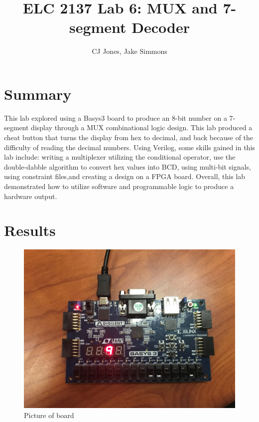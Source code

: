 \documentclass[11pt]{article}
\begin{document}
\title{ELC 2137 Lab 6: MUX and 7-segment Decoder}
\author{CJ Jones, Jake Simmons}

\maketitle


\section*{Summary}

This lab explored using a Basys3 board to produce an 8-bit number on a 7-segment display through a MUX combinational logic design. This lab produced a cheat button that turns the display from hex to decimal, and back because of the difficulty of reading the decimal numbers. Using Verilog, some skills gained in this lab include: writing a multiplexer utilizing the conditional operator, use the double-dabble algorithm to convert hex values into BCD, using multi-bit signals, using constraint files,and creating a design on a FPGA board. Overall, this lab demonstrated how to utilize software and programmable logic to produce a hardware output.








\section*{Results}


\begin{figure}[ht]\centering
	\includegraphics[width=1.0\textwidth]{9}
	\caption{Picture of board}
	\label{fig:sim_with_table}
\end{figure}
\end{document}
